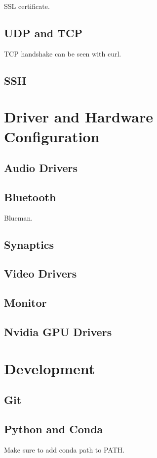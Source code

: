 \documentclass{article}
\begin{document}
    SSL certificate. 

    
  \subsection{UDP and TCP}

    TCP handshake can be seen with curl. 

  \subsection{SSH}


\section{Driver and Hardware Configuration}

  \subsection{Audio Drivers} 


  \subsection{Bluetooth}
    Blueman. 

  \subsection{Synaptics}


  \subsection{Video Drivers}


  \subsection{Monitor}


  \subsection{Nvidia GPU Drivers} 


\section{Development}

  \subsection{Git} 
    


  \subsection{Python and Conda}

    Make sure to add conda path to PATH. 
\end{document}
